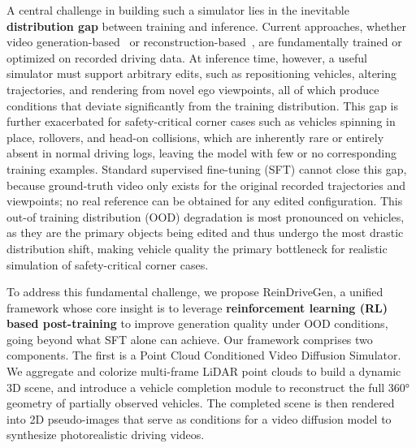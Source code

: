 \documentclass[runningheads]{llncs}
\begin{document}
A central challenge in building such a simulator lies in the inevitable \textbf{distribution gap} between training and inference. Current approaches, whether video generation-based~\cite{gao2025magicdrive-v2,ni2025maskgwm,nvidia2026worldsimulationvideofoundation} or reconstruction-based~\cite{mildenhall2020nerf,kerbl20233d,zhao2024drive,fan2025freesim,ni2025recondreamer,yan2025streetcrafter}, are fundamentally trained or optimized on recorded driving data. At inference time, however, a useful simulator must support arbitrary edits, such as repositioning vehicles, altering trajectories, and rendering from novel ego viewpoints, all of which produce conditions that deviate significantly from the training distribution. This gap is further exacerbated for safety-critical corner cases such as vehicles spinning in place, rollovers, and head-on collisions, which are inherently rare or entirely absent in normal driving logs, leaving the model with few or no corresponding training examples. Standard supervised fine-tuning (SFT) cannot close this gap, because ground-truth video only exists for the original recorded trajectories and viewpoints; no real reference can be obtained for any edited configuration. This out-of training distribution (OOD) degradation is most pronounced on vehicles, as they are the primary objects being edited and thus undergo the most drastic distribution shift, making vehicle quality the primary bottleneck for realistic simulation of safety-critical corner cases.



To address this fundamental challenge, we propose ReinDriveGen, a unified framework whose core insight is to leverage \textbf{reinforcement learning (RL) based post-training} to improve generation quality under OOD conditions, going beyond what SFT alone can achieve. Our framework comprises two components. The first is a Point Cloud Conditioned Video Diffusion Simulator. We aggregate and colorize multi-frame LiDAR point clouds to build a dynamic 3D scene, and introduce a vehicle completion module to reconstruct the full 360° geometry of partially observed vehicles. The completed scene is then rendered into 2D pseudo-images that serve as conditions for a video diffusion model to synthesize photorealistic driving videos. 
\end{document}
